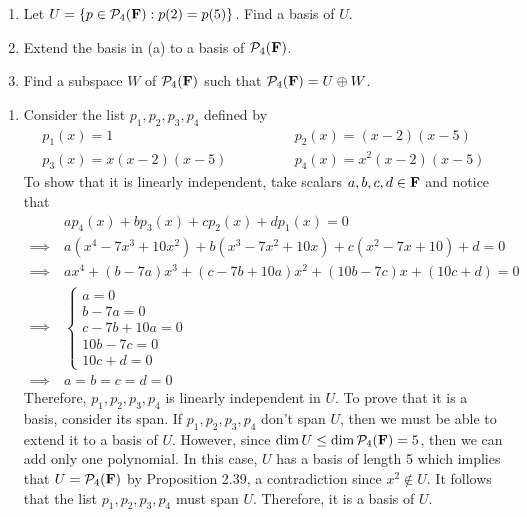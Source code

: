 \begin{exercise}
    \vspace*{-0.6cm}
    \begin{enumerate}[label=(\alph*)]
        \item Let $U = \{p \in \mathcal{P}_4(\mathbf{F}):p(2) = p(5)\}$. Find a basis of $U$.
        \item Extend the basis in (a) to a basis of $\mathcal{P}_4(\mathbf{F})$.
        \item Find a subspace $W$ of $\mathcal{P}_4(\mathbf{F})$ such that $\mathcal{P}_4(\mathbf{F}) = U \oplus W$.\\
    \end{enumerate}
\end{exercise}

\begin{solution}
    \begin{enumerate}[label=(\alph*)]
        \item Consider the list $p_1, p_2, p_3, p_4$ defined by
        \begin{align*}
            p_1(x) = 1 \qquad &\qquad p_2(x) = (x- 2)(x-5) \\
            p_3(x) = x(x- 2)(x-5) \qquad &\qquad p_4(x) = x^2 (x- 2)(x-5)
        \end{align*}
        To show that it is linearly independent, take scalars $a,b,c,d \in \mathbf{F}$ and notice that
        \begin{align*}
            &ap_4(x) + bp_3(x) + cp_2(x) + dp_1(x) = 0 \\
            \implies \ & a(x^4 - 7x^3 + 10x^2)  + b(x^3 - 7x^2 + 10x) + c(x^2 - 7x + 10) + d = 0\\ 
            \implies \ & ax^4 + (b - 7a)x^3 + (c-7b + 10a)x^2 + (10b - 7c)x + (10c+d) = 0 \\
            \implies \ & \begin{cases}
                a=0 \\ b-7a = 0 \\ c-7b+10a = 0 \\ 10b-7c = 0 \\ 10c+d = 0
            \end{cases} \\
            \implies \ & a=b=c=d=0
        \end{align*}
        Therefore, $p_1, p_2, p_3, p_4$ is linearly independent in $U$. To prove that it is a basis, consider its span. If $p_1, p_2, p_3, p_4$ don't span $U$, then we must be able to extend it to a basis of $U$. However, since $\dim U \leq \dim \mathcal{P}_4(\mathbf{F}) = 5$, then we can add only one polynomial. In this case, $U$ has a basis of length 5 which implies that $U = \mathcal{P}_4(\mathbf{F})$ by Proposition 2.39, a contradiction since $x^2 \notin U$. It follows that the list $p_1, p_2, p_3, p_4$ must span $U$. Therefore, it is a basis of $U$.

\end{enumerate}
\end{solution}
